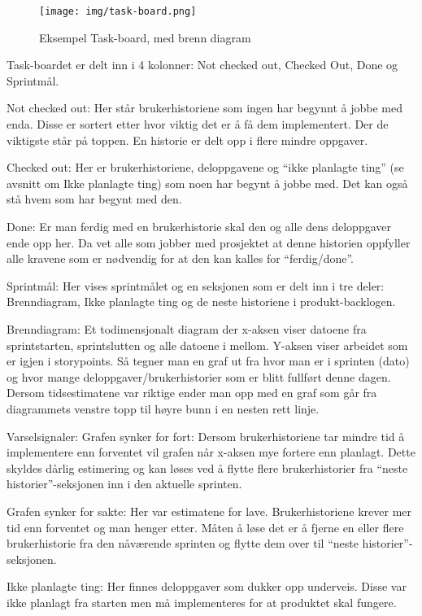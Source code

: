 \documentclass[12pt,a4paper,norsk]{article}
\begin{document}
    \begin{figure}[h!]
 		\texttt{[image: img/task-board.png]}
  		\caption{Eksempel Task-board, med brenn diagram}
  		\label{fig:task-board}
	\end{figure}
	
    Task-boardet er delt inn i 4 kolonner: Not checked out, Checked Out, Done og Sprintmål.
    
    Not checked out: Her står brukerhistoriene som ingen har begynnt å jobbe med enda. Disse er sortert etter hvor viktig det er å få dem implementert. Der de viktigste står på toppen. En historie er delt opp i flere mindre oppgaver.

    Checked out: Her er brukerhistoriene, deloppgavene og “ikke planlagte ting” (se avsnitt om Ikke planlagte ting) som noen har begynt å jobbe med. Det kan også stå hvem som har begynt med den.

    Done: Er man ferdig med en brukerhistorie skal den og alle dens deloppgaver ende opp her. Da vet alle som jobber med prosjektet at denne historien oppfyller alle kravene som er nødvendig for at den kan kalles for “ferdig/done”.
	
    Sprintmål: Her vises sprintmålet og en seksjonen som er delt inn i tre deler: Brenndiagram, Ikke planlagte ting og de neste historiene i produkt-backlogen.

    Brenndiagram:
    Et todimensjonalt diagram der x-aksen viser datoene fra sprintstarten, sprintslutten og alle datoene i mellom. Y-aksen viser arbeidet som er igjen i storypoints. Så tegner man en graf ut fra hvor man er i sprinten (dato) og hvor mange deloppgaver/brukerhistorier som er blitt fullført denne dagen. Dersom tidsestimatene var riktige ender man opp med en graf som går fra diagrammets venstre topp til høyre bunn i en nesten rett linje.

    Varselsignaler:
	Grafen synker for fort:
    Dersom brukerhistoriene tar mindre tid å implementere enn forventet vil grafen når x-aksen mye fortere enn planlagt. Dette skyldes dårlig estimering og kan løses ved å flytte flere brukerhistorier fra “neste historier”-seksjonen inn i den aktuelle sprinten.

	Grafen synker for sakte:
    Her var estimatene for lave. Brukerhistoriene krever mer tid enn forventet og man henger etter. Måten å løse det er å fjerne en eller flere brukerhistorie fra den nåværende sprinten og flytte dem over til “neste historier”-seksjonen.

    Ikke planlagte ting:
    Her finnes deloppgaver som dukker opp underveis. Disse var ikke planlagt fra starten men må implementeres for at produktet skal fungere.
\end{document}
